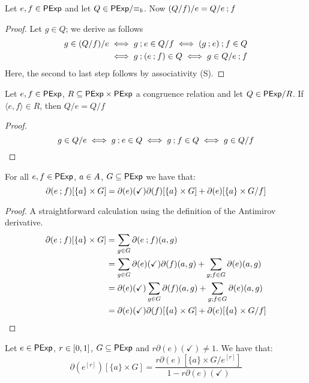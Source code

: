 \begin{lemma}\label{apx:lem:associativity_of_cutting}
    Let \(e,f \in \mathsf{PExp}\) and let \(Q \in \mathsf{PExp} / {\equiv_b}\).
    Now \((Q/{f})/{e} = Q / {e}\mathbin{;}{f}\)
\end{lemma}
\begin{proof}
    Let \({g} \in Q\); we derive as follows
    \begin{align*}
        {g} \in (Q/ {f})/{e}
            &\iff {g} \mathbin{;} {e} \in Q/{f}
            \iff ({g} \mathbin{;} {e}) \mathbin{;}{{f}} \in Q\\
            &\iff {g} \mathbin{;} ({e} \mathbin{;} {f}) \in Q
            \iff {g} \in Q / {{e} \mathbin{;} {f}}
    \end{align*}
    Here, the second to last step follows by associativity (\textsf{S}).
\end{proof}
\begin{lemma}\label{apx:lem:swapping_ends}
Let $e,f \in \mathsf{PExp}$, $R \subseteq {\mathsf{PExp}\times \mathsf{PExp}}$ a congruence relation and let $Q \in {\mathsf{PExp}}/{R}$. If $\langle e , f \rangle \in R$, then  $Q/e = Q/f$
\end{lemma}
\begin{proof}
    $$
    {g} \in Q / {e} \iff g \mathbin{;} e \in Q \iff g \mathbin{;} f \in Q \iff g \in Q/f
    $$
\end{proof}
\begin{lemma}\label{apx:lem:simpler_sequencing_semantics}
    For all $e,f \in \mathsf{PExp}$, $a \in {A}$, $G \subseteq \mathsf{PExp}$ we have that:
    $$
    \partial(e \mathbin{;} f)[\{a\} \times G] = \partial(e)(\checkmark)\partial(f)[\{a\} \times G] + \partial(e)[\{a\} \times {G}/{f}]
    $$
\end{lemma}
\begin{proof}
    A straightforward calculation using the definition of the Antimirov derivative.
    \begin{align*}
        \partial(e \mathbin{;} f)[\{a\} \times G] &= \sum_{g \in G} \partial(e \mathbin{;} f)(a,g) \\
        &=\sum_{g \in G} \partial(e)(\checkmark)\partial(f)(a,g) + \sum_{g \mathbin{;} f \in G} \partial(e)(a,g) \\
        &=\partial(e)(\checkmark)\sum_{g \in G}\partial(f)(a,g) + \sum_{g \mathbin{;} f \in G} \partial(e)(a,g) \\
        &=\partial(e)(\checkmark)\partial(f)[\{a\} \times G] + \partial(e)[\{a\} \times {G}/{f}] \\
    \end{align*}
\end{proof}
\begin{lemma}\label{apx:lem:simpler_loop_semantics}
    Let $e \in \mathsf{PExp}$, $r \in \interval{0}{1}$, $G \subseteq \mathsf{PExp}$ and $r\partial(e)(\checkmark) \neq 1$. We have that:
    $$
    \partial\left(e^{[r]}\right)[\{a\} \times G] =\frac{r\partial(e)[\{a\} \times {G}/{e^{[r]}}]}{1-r\partial(e)(\checkmark)}
    $$
\end{lemma}
